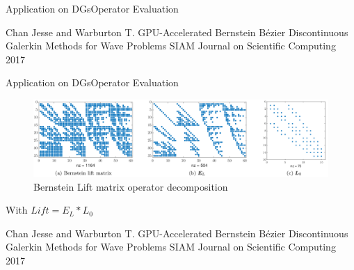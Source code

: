 \documentclass[10pt]{beamer}
\begin{document}
\begin{frame}{Application on DGs}{Operator Evaluation}
  \vfill
  \tiny
  \begin{thebibliography}{1}
   Chan Jesse and Warburton T. 
    \newblock GPU-Accelerated Bernstein Bézier Discontinuous Galerkin Methods for Wave Problems
    \newblock SIAM Journal on Scientific Computing 2017
  \end{thebibliography}
\end{frame}


\begin{frame}{Application on DGs}{Operator Evaluation}

  \vspace{-0.5cm}
  \begin{figure}
    \includegraphics[scale=0.27]{liftmatrix.png}
    Bernstein Lift matrix operator decomposition
  \end{figure}
  \vspace{0.5cm}
  With $Lift=E_L*L_0$

  \vfill
  \tiny
  \begin{thebibliography}{3}
   Chan Jesse and Warburton T. 
    \newblock GPU-Accelerated Bernstein Bézier Discontinuous Galerkin Methods for Wave Problems
    \newblock SIAM Journal on Scientific Computing 2017
  \end{thebibliography}
\end{frame}
\end{document}
